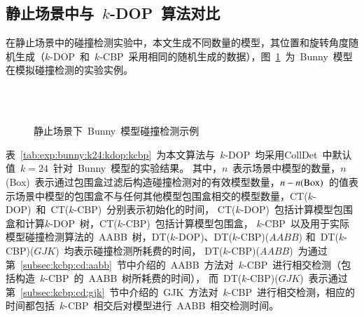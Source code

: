 \subsection{静止场景中与~$k$-DOP~算法对比}
\label{subsec:exper:kdop:kcbp:static}
在静止场景中的碰撞检测实验中，本文生成不同数量的模型，其位置和旋转角度随机生成（$k$-DOP~和~$k$-CBP~采用相同的随机生成的数据），图~\ref{fig:static:cd:bunny}~为~Bunny~模型在模拟碰撞检测的实验实例。

\begin{figure}[htbp]
\centering
{} 
\\ 
\\
\caption{静止场景下~Bunny~模型碰撞检测示例}
\label{fig:static:cd:bunny}
\end{figure}

表~\ref{tab:exp:bunny:k24:kdop:kcbp}~为本文算法与~$k$-DOP~均采用CollDet~中默认值~$k=24$~针对~Bunny~模型的实验结果。
其中，$n$~表示场景中模型的数量，$n$(Box)~表示通过包围盒过滤后构造碰撞检测对的有效模型数量，$n-n(\textnormal{Box})$~的值表示场景中模型的包围盒不与任何其他模型包围盒相交的模型数量，CT($k$-DOP)~和~CT($k$-CBP)~分别表示初始化的时间， CT($k$-DOP)~包括计算模型包围盒和计算$k$-DOP~树，CT($k$-CBP)~包括计算模型包围盒，
$k$-CBP~以及用于实际模型碰撞检测算法的~AABB~树，DT($k$-DOP)、DT($k$-CBP)($AABB$) 和~DT($k$-CBP)($GJK$)~均表示碰撞检测所耗费的时间， 
DT($k$-CBP)($AABB$)~为通过第~\ref{subsec:kcbp:cd:aabb}~节中介绍的~AABB~方法对~$k$-CBP~进行相交检测（包括构造~$k$-CBP~的~AABB~树所耗费的时间），
而~DT($k$-CBP)($GJK$)~表示通过第~\ref{subsec:kcbp:cd:gjk}~节中介绍的~GJK~方法对~$k$-CBP~进行相交检测，相应的时间都包括~$k$-CBP~相交后对模型进行~AABB~相交检测时间。

